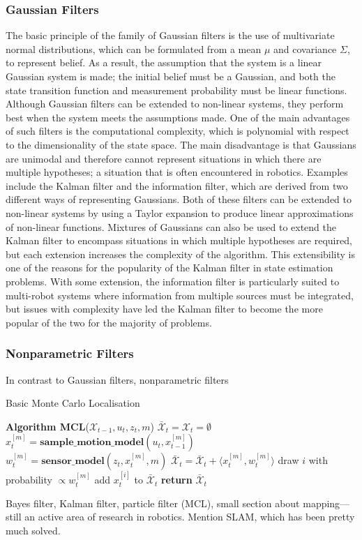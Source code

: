 \documentclass[conference]{IEEEtran}
\begin{document}
\subsubsection{Gaussian Filters}
The basic principle of the family of Gaussian filters is the use of multivariate normal distributions, which can be formulated from a mean $\mu$ and covariance $\Sigma$, to represent belief. As a result, the assumption that the system is a linear Gaussian system is made; the initial belief must be a Gaussian, and both the state transition function and measurement probability must be linear functions. Although Gaussian filters can be extended to non-linear systems, they perform best when the system meets the assumptions made. One of the main advantages of such filters is the computational complexity, which is polynomial with respect to the dimensionality of the state space. The main disadvantage is that Gaussians are unimodal and therefore cannot represent situations in which there are multiple hypotheses; a situation that is often encountered in robotics. Examples include the Kalman filter and the information filter, which are derived from two different ways of representing Gaussians. Both of these filters can be extended to non-linear systems by using a Taylor expansion to produce linear approximations of non-linear functions. Mixtures of Gaussians can also be used to extend the Kalman filter to encompass situations in which multiple hypotheses are required, but each extension increases the complexity of the algorithm. This extensibility is one of the reasons for the popularity of the Kalman filter in state estimation problems. With some extension, the information filter is particularly suited to multi-robot systems where information from multiple sources must be integrated, but issues with complexity have led the Kalman filter to become the more popular of the two for the majority of problems.
\subsubsection{Nonparametric Filters}
In contrast to Gaussian filters, nonparametric filters \\
\begin{algorithm}
  \caption{Basic Monte Carlo Localisation\cite{thrun}}
  \label{alg:basicMCL}
  \begin{algorithmic}[1]
    \State \textbf{Algorithm MCL}\textnormal{($\mathcal{X}_{t-1}, u_t, z_t, m$)}
    \State $\bar{\mathcal{X}}_t=\mathcal{X}_t=\emptyset$
    \State $x_t^{[m]}=\textbf{sample\_motion\_model}(u_t,x_{t-1}^{[m]})$
    \State $w_t^{[m]}=\textbf{sensor\_model}(z_t,x_t^{[m]},m)$
    \State $\bar{\mathcal{X}}_t=\bar{\mathcal{X}}_t+\langle x_t^{[m]},w_t^{[m]}\rangle$
    \EndFor
    \State \textnormal{draw $i$ with probability $\propto w_t^{[m]}$}
    \State \textnormal{add $x_t^{[i]}$ to $\bar{\mathcal{X}}_t$}
    \EndFor
    \State \textbf{return} $\bar{\mathcal{X}}_t$
  \end{algorithmic}
\end{algorithm}
Bayes filter, Kalman filter, particle filter (MCL), small section about mapping---still an active area of research in robotics. Mention SLAM, which has been pretty much solved.
\end{document}
